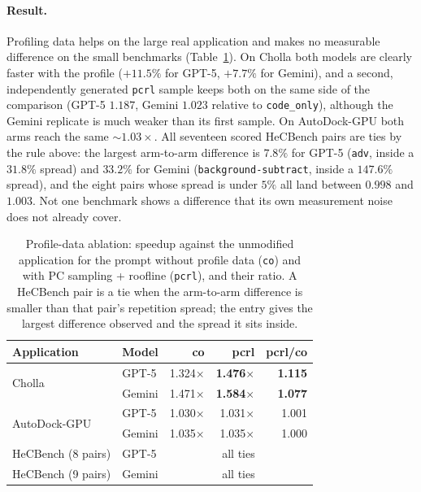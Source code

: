 \paragraph{Result.}
Profiling data helps on the large real application and makes no measurable difference on the small
benchmarks (Table~\ref{tab:profabl}). On Cholla both models are clearly faster with the profile
($+11.5\%$ for GPT-5, $+7.7\%$ for Gemini), and a second, independently generated \texttt{pcrl} sample
keeps both on the same side of the comparison (GPT-5 $1.187$, Gemini $1.023$ relative to
\texttt{code\_only}), although the Gemini replicate is much weaker than its first sample. On
AutoDock-GPU both arms reach the same ${\sim}1.03\times$. All seventeen scored HeCBench pairs are ties
by the rule above: the largest arm-to-arm difference is $7.8\%$ for GPT-5 (\texttt{adv}, inside a
$31.8\%$ spread) and $33.2\%$ for Gemini (\texttt{background-subtract}, inside a $147.6\%$ spread), and
the eight pairs whose spread is under $5\%$ all land between $0.998$ and $1.003$. Not one benchmark
shows a difference that its own measurement noise does not already cover.


\begin{table}[t]
\centering
\footnotesize
\caption{Profile-data ablation: speedup against the unmodified application for the prompt without
  profile data (\texttt{co}) and with PC sampling + roofline (\texttt{pcrl}), and their ratio.
  A HeCBench pair is a tie when the arm-to-arm difference is smaller than that pair's repetition
  spread; the entry gives the largest difference observed and the spread it sits inside.}
\label{tab:profabl}
\setlength{\tabcolsep}{2pt}
\begin{tabular}{@{}llrrr@{}}
\toprule
\textbf{Application} & \textbf{Model} & \textbf{co} & \textbf{pcrl} & \textbf{pcrl/co} \\
\midrule
\multirow{2}{*}{Cholla}
  & GPT-5  & 1.324$\times$ & \textbf{1.476}$\times$ & \textbf{1.115} \\
  & Gemini & 1.471$\times$ & \textbf{1.584}$\times$ & \textbf{1.077} \\
\midrule
\multirow{2}{*}{AutoDock-GPU}
  & GPT-5  & 1.030$\times$ & 1.031$\times$ & 1.001 \\
  & Gemini & 1.035$\times$ & 1.035$\times$ & 1.000 \\
\midrule
HeCBench (8 pairs) & GPT-5  & \multicolumn{3}{c}{all ties} \\
HeCBench (9 pairs) & Gemini & \multicolumn{3}{c}{all ties} \\
\bottomrule
\end{tabular}
\end{table}

